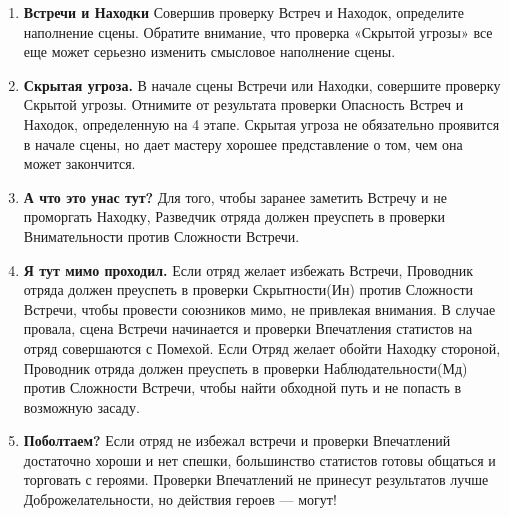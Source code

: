 \begin{enumerate}
\item \textbf{Встречи и Находки} Совершив проверку Встреч и Находок, определите наполнение сцены. Обратите внимание, что проверка «Скрытой угрозы» все еще может серьезно изменить смысловое наполнение сцены.
\item \textbf{Скрытая угроза.} В начале сцены Встречи или Находки, совершите проверку Скрытой угрозы. Отнимите от результата проверки Опасность Встреч и Находок, определенную на 4 этапе. Скрытая угроза не обязательно проявится в начале сцены, но дает мастеру хорошее представление о том, чем она может закончится.
\item \textbf{А что это унас тут?} Для того, чтобы заранее заметить Встречу и не проморгать Находку, Разведчик отряда должен преуспеть в проверки Внимательности против Сложности Встречи.
\item \textbf{Я тут мимо проходил.} Если отряд желает избежать Встречи, Проводник отряда должен преуспеть в проверки Скрытности(Ин) против Сложности Встречи, чтобы провести союзников мимо, не привлекая внимания. В случае провала, сцена Встречи начинается и проверки Впечатления статистов на отряд совершаются с Помехой.
\newline
Если Отряд желает обойти Находку стороной, Проводник отряда должен преуспеть в проверки Наблюдательности(Мд) против Сложности Встречи, чтобы найти обходной путь и не попасть в возможную засаду.
\item \textbf{Поболтаем?} Если отряд не избежал встречи и проверки Впечатлений достаточно хороши и нет спешки, большинство статистов готовы общаться и торговать с героями. Проверки Впечатлений не принесут результатов лучше Доброжелательности, но действия героев — могут!
\end{enumerate}
